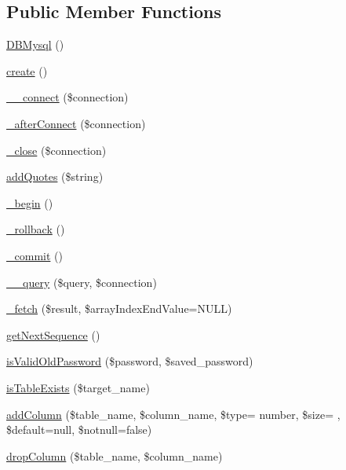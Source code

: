 \subsection*{Public Member Functions}
\begin{DoxyCompactItemize}
\item 
\hyperlink{classDBMysql_a74c9966448ca4a373407ce6f3a1d7eb0}{D\+B\+Mysql} ()
\item 
\hyperlink{classDBMysql_a58ab5c56561966d486ba54129aed954d}{create} ()
\item 
\hyperlink{classDBMysql_ad11061c47d57c2f346947e0789ecb46b}{\+\_\+\+\_\+connect} (\$connection)
\item 
\hyperlink{classDBMysql_a660e94bc5cde26859bb95cc428ca92da}{\+\_\+after\+Connect} (\$connection)
\item 
\hyperlink{classDBMysql_a59581237e4dcb5f91f63de2459248e13}{\+\_\+close} (\$connection)
\item 
\hyperlink{classDBMysql_a9674193c36272fa9ea16c20d91cfbfe5}{add\+Quotes} (\$string)
\item 
\hyperlink{classDBMysql_a7ad4bfffa35bf75ddafb93767d03a5b7}{\+\_\+begin} ()
\item 
\hyperlink{classDBMysql_a99969f9cdea111207f80faaa8a74c0ab}{\+\_\+rollback} ()
\item 
\hyperlink{classDBMysql_a3f720677af37c36b2bc2934dd358a477}{\+\_\+commit} ()
\item 
\hyperlink{classDBMysql_aa33da673a8c415b641b4e0b5209d3453}{\+\_\+\+\_\+query} (\$query, \$connection)
\item 
\hyperlink{classDBMysql_a4c7d83d8dcbb8e65c8fdfe75fa7d9fa5}{\+\_\+fetch} (\$result, \$array\+Index\+End\+Value=N\+U\+L\+L)
\item 
\hyperlink{classDBMysql_a926ea6ca10e71ae128be90604b78411f}{get\+Next\+Sequence} ()
\item 
\hyperlink{classDBMysql_a19020f1ece293bcc332400234ee95dea}{is\+Valid\+Old\+Password} (\$password, \$saved\+\_\+password)
\item 
\hyperlink{classDBMysql_a095f2a64a070958c18cb3ebfab3043e5}{is\+Table\+Exists} (\$target\+\_\+name)
\item 
\hyperlink{classDBMysql_ab9f9ee7573485e7767c1dd7dd54cead0}{add\+Column} (\$table\+\_\+name, \$column\+\_\+name, \$type= \textquotesingle{}number\textquotesingle{}, \$size= \textquotesingle{}\textquotesingle{}, \$default=null, \$notnull=false)
\item 
\hyperlink{classDBMysql_aa4cd80d663225f3cd7a539d7d7101b38}{drop\+Column} (\$table\+\_\+name, \$column\+\_\+name)

\end{DoxyCompactItemize}
